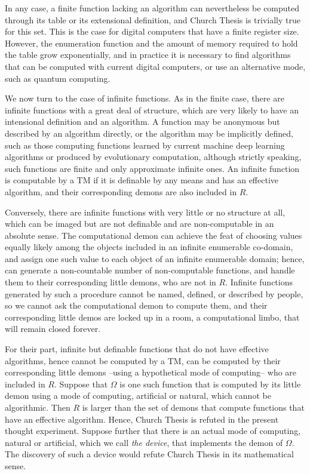 \documentclass[11pt]{article}
\begin{document}
In any case, a finite function lacking an algorithm can nevertheless be computed through its table or its extensional definition, and Church Thesis is trivially true for this set. This is the case for digital computers that have a finite register size. However, the enumeration function and the amount of memory required to hold the table grow exponentially, and in practice it is necessary to find algorithms that can be computed with current digital computers, or use an alternative mode, such as quantum computing. 

We now turn to the case of infinite functions. As in the finite case, there are infinite functions with a great deal of structure, which are very likely to have an intensional definition and an algorithm. A function may be anonymous but described by an algorithm directly, or the algorithm may be implicitly defined, such as those computing functions learned by current machine deep learning algorithms or produced by evolutionary computation, although strictly speaking, such functions are finite and only approximate infinite ones. An infinite function is computable by a TM if it is definable by any means and has an effective algorithm, and their corresponding demons are also included in $R$. 

Conversely, there are infinite functions with very little or no structure at all, which can be imaged but are not definable and are non-computable in an absolute sense. The computational demon can achieve the feat of choosing values equally likely among the objects included in an infinite enumerable co-domain, and assign one such value to each object of an infinite enumerable domain; hence, can generate a non-countable number of non-computable functions, and handle them to their corresponding little demons, who are not in $R$. Infinite functions generated by such a procedure cannot be named, defined, or described by people, so we cannot ask the computational demon to compute them, and their corresponding little demos are locked up in a room, a computational limbo, that will remain closed forever.

For their part, infinite but definable functions that do not have effective algorithms, hence cannot be computed by a TM, can be computed by their corresponding little demons --using a hypothetical mode of computing-- who are included in $R$. Suppose that $\Omega$ is one such function that is computed by its little demon using a mode of computing, artificial or natural, which cannot be algorithmic. Then $R$ is larger than the set of demons that compute functions that have an effective algorithm. Hence, Church Thesis is refuted in the present thought experiment. Suppose further that there is an actual mode of computing, natural or artificial, which we call \emph{the device}, that implements the demon of $\Omega$. The discovery of such a device would refute Church Thesis in its mathematical sense.
\end{document}
